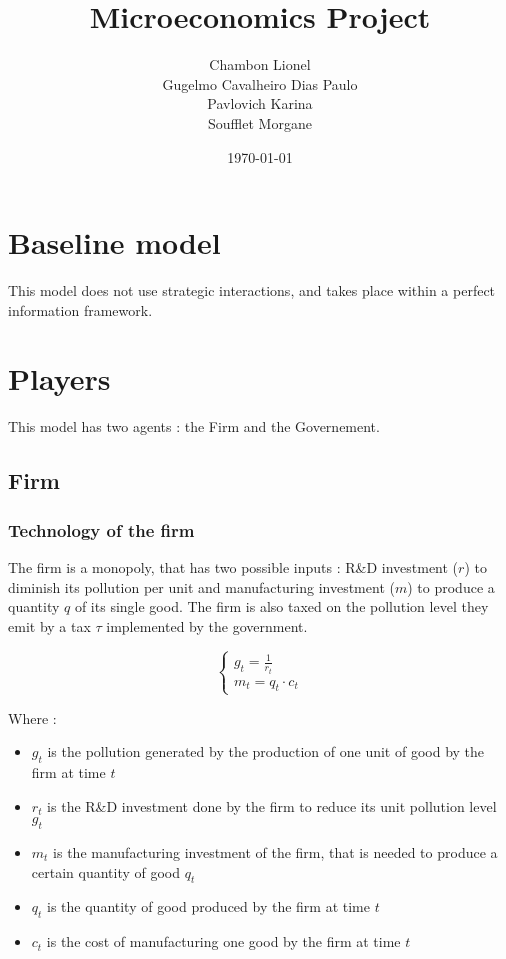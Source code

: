 \documentclass{article}
\title{Microeconomics Project}
\author{Chambon Lionel \\ Gugelmo Cavalheiro Dias Paulo \\ Pavlovich Karina \\ Soufflet Morgane}
\date{\today}
\begin{document}
\maketitle

\section{Baseline model}

This model does not use strategic interactions, and takes place within a perfect information framework. 

\section{Players}

This model has two agents : the Firm and the Governement. 

\subsection{Firm}

\subsubsection{Technology of the firm}

The firm is a monopoly, that has two possible inputs : R\&D investment ($r$) to diminish its pollution per unit and manufacturing investment ($m$) to produce a quantity $q$ of its single good. The firm is also taxed on the pollution level they emit by a tax $\tau$ implemented by the government.

\begin{equation}
    \begin{cases}
        g_{t}=\frac{1}{r_{t}} \\
        m_{t} = q_{t}\cdot c_{t}
    \end{cases}
\end{equation}

Where : 
\begin{itemize}
    \item $g_{t}$ is the pollution generated by the production of one unit of good by the firm at time $t$
    \item $r_{t}$ is the R\&D investment done by the firm to reduce its unit pollution level $g_{t}$
    \item $m_{t}$ is the manufacturing investment of the firm, that is needed to produce a certain quantity of good $q_{t}$
    \item $q_{t}$ is the quantity of good produced by the firm at time $t$
    \item $c_{t}$ is the cost of manufacturing one good by the firm at time $t$
\end{itemize}
\end{document}
